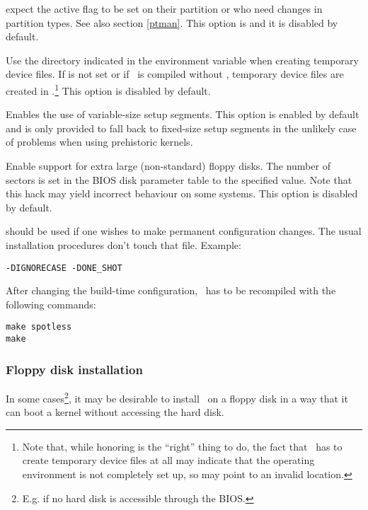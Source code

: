 \begin{description}
    expect the active flag to be set on their partition or who need changes
    in partition types. See also section
    \ref{ptman}. This option is  and it is disabled by
    default.
  \item[\raw{USE\_TMPDIR}] Use the directory indicated in the 
    environment variable when creating temporary device files. If 
    is not set or if \LILO\ is compiled without , temporary
    device files are created in .\footnote{Note that, while honoring
     is the ``right'' thing to do, the fact that \LILO\ has to
    create temporary device files at all may indicate that the operating
    environment is not completely set up, so  may point to an
    invalid location.} This option is disabled by default.
  \item[\raw{VARSETUP}] Enables the use of variable-size setup segments.
    This option is enabled by default and is only provided to fall back to
    fixed-size setup segments in the unlikely case of problems when using
    prehistoric kernels.
  \item[\raw{XL\_SECS=\meta{sectors}}] Enable support for extra large
    (non-standard) floppy disks. The number of sectors is set in the BIOS
    disk parameter table to the specified value. Note that this hack may
    yield incorrect behaviour on some systems. This option is disabled by
    default.
\end{description}

 should be used if one wishes to make
permanent configuration changes. The usual installation procedures don't
touch that file. Example:

\begin{verbatim}
-DIGNORECASE -DONE_SHOT
\end{verbatim}

After changing the build-time configuration, \LILO\ has to be recompiled
with the following commands:

\begin{verbatim}
make spotless
make
\end{verbatim}


\subsubsection{Floppy disk installation}

In some cases\footnote{E.g. if no hard disk is accessible through the BIOS.},
it may be desirable to install \LILO\ on a floppy disk in a way that it can
boot a kernel without accessing the hard disk.

